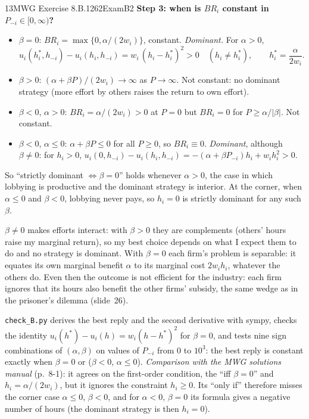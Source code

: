 \begin{exsol}{13}{MWG Exercise 8.B.1}{262}{Exam}{B2}
\textbf{Step 3: when is $BR_i$ constant in $P_{-i} \in [0, \infty)$?}
\begin{itemize}
  \item $\beta = 0$: $BR_i = \max\{0, \alpha/(2w_i)\}$, constant. \emph{Dominant.} For $\alpha > 0$,
  \[
    u_i(h_i^*, h_{-i}) - u_i(h_i, h_{-i}) = w_i\,(h_i - h_i^*)^2 > 0 \quad (h_i \ne h_i^*),
    \qquad h_i^* = \frac{\alpha}{2 w_i}.
  \]
  \item $\beta > 0$: $(\alpha + \beta P)/(2w_i) \to \infty$ as $P \to \infty$. Not constant: no
  dominant strategy (more effort by others raises the return to own effort).
  \item $\beta < 0$, $\alpha > 0$: $BR_i = \alpha/(2w_i) > 0$ at $P = 0$ but $BR_i = 0$ for
  $P \ge \alpha/|\beta|$. Not constant.
  \item $\beta < 0$, $\alpha \le 0$: $\alpha + \beta P \le 0$ for all $P \ge 0$, so $BR_i \equiv 0$.
  \emph{Dominant}, although $\beta \ne 0$: for $h_i > 0$,
  $u_i(0, h_{-i}) - u_i(h_i, h_{-i}) = -(\alpha + \beta P_{-i}) h_i + w_i h_i^2 > 0$.
\end{itemize}
So ``strictly dominant $\Leftrightarrow \beta = 0$'' holds whenever $\alpha > 0$, the case in
which lobbying is productive and the dominant strategy is interior. At the corner, when
$\alpha \le 0$ and $\beta < 0$, lobbying never pays, so $h_i = 0$ is strictly dominant for any
such $\beta$.

\interp $\beta \ne 0$ makes efforts interact: with $\beta > 0$ they are complements (others'
hours raise my marginal return), so my best choice depends on what I expect them to do and no
strategy is dominant. With $\beta = 0$ each firm's problem is separable: it equates its own
marginal benefit $\alpha$ to its marginal cost $2w_i h_i$, whatever the others do. Even then the
outcome is not efficient for the industry: each firm ignores that its hours also benefit the
other firms' subsidy, the same wedge as in the prisoner's dilemma (slide~26).

\verify \texttt{check\_B.py} derives the best reply and the second derivative with sympy, checks
the identity $u_i(h^*) - u_i(h) = w_i(h - h^*)^2$ for $\beta = 0$, and tests nine sign
combinations of $(\alpha, \beta)$ on values of $P_{-i}$ from 0 to $10^3$: the best reply is
constant exactly when $\beta = 0$ or ($\beta < 0$, $\alpha \le 0$). \emph{Comparison with the MWG
solutions manual} (p.~8-1): it agrees on the first-order condition, the ``iff $\beta = 0$'' and
$h_i = \alpha/(2w_i)$, but it ignores the constraint $h_i \ge 0$. Its ``only if'' therefore
misses the corner case $\alpha \le 0$, $\beta < 0$, and for $\alpha < 0$, $\beta = 0$ its formula
gives a negative number of hours (the dominant strategy is then $h_i = 0$).

\end{exsol}

